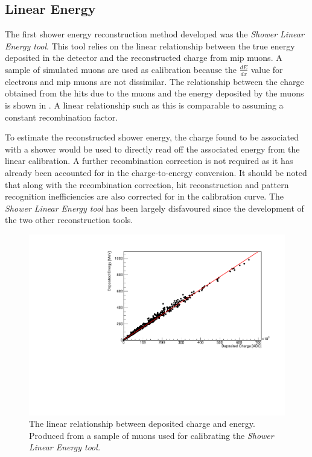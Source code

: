 \subsection{Linear Energy}\label{subchap:Linear Energy Tool}
The first shower energy reconstruction method developed was the \textit{Shower Linear Energy tool}. This tool relies on the linear relationship between the true energy deposited in the detector and the reconstructed charge from \gls{mip} muons. A sample of simulated muons are used as calibration because the $\frac{dE}{dx}$ value for electrons and \Gls{mip} muons are not dissimilar. The relationship between the charge obtained from the hits due to the muons and the energy deposited by the muons is shown in . A linear relationship such as this is comparable to assuming a constant recombination factor. 


To estimate the reconstructed shower energy, the charge found to be associated with a shower would be used to directly read off the associated energy from the linear calibration. A further recombination correction is not required as it has already been accounted for in the charge-to-energy conversion. It should be noted that along with the recombination correction, hit reconstruction and pattern recognition inefficiencies are also corrected for in the calibration curve.  The \textit{Shower Linear Energy tool} has been largely disfavoured since the development of the two other reconstruction tools. 

\begin{figure}[h!]
    \centering
    \includegraphics[width = \largefigwidth]{figures-chap4/linear_tool_lookup_curve.pdf}
    \caption{The linear relationship between deposited charge and energy. Produced from a sample of muons used for calibrating the \textit{Shower Linear Energy tool.}}
    \label{fig:linear lookup curve}
\end{figure}

